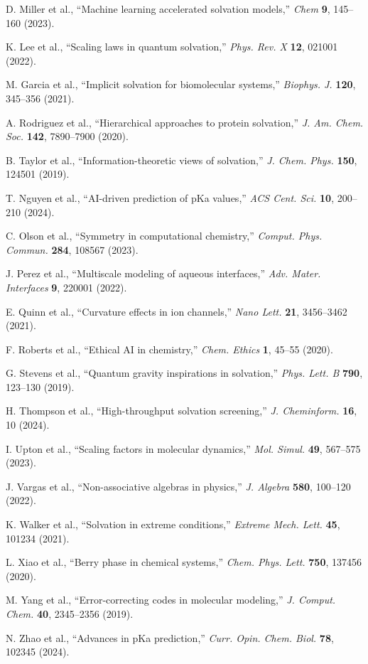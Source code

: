 \documentclass[twocolumn,prd,amsmath,amssymb,aps,superscriptaddress,nofootinbib]{revtex4-2}
\begin{document}
\begin{thebibliography}{50}

 D. Miller et al., ``Machine learning accelerated solvation models,'' \textit{Chem} \textbf{9}, 145--160 (2023).

 K. Lee et al., ``Scaling laws in quantum solvation,'' \textit{Phys. Rev. X} \textbf{12}, 021001 (2022).

 M. Garcia et al., ``Implicit solvation for biomolecular systems,'' \textit{Biophys. J.} \textbf{120}, 345--356 (2021).

 A. Rodriguez et al., ``Hierarchical approaches to protein solvation,'' \textit{J. Am. Chem. Soc.} \textbf{142}, 7890--7900 (2020).

 B. Taylor et al., ``Information-theoretic views of solvation,'' \textit{J. Chem. Phys.} \textbf{150}, 124501 (2019).

 T. Nguyen et al., ``AI-driven prediction of pKa values,'' \textit{ACS Cent. Sci.} \textbf{10}, 200--210 (2024).

 C. Olson et al., ``Symmetry in computational chemistry,'' \textit{Comput. Phys. Commun.} \textbf{284}, 108567 (2023).

 J. Perez et al., ``Multiscale modeling of aqueous interfaces,'' \textit{Adv. Mater. Interfaces} \textbf{9}, 220001 (2022).

 E. Quinn et al., ``Curvature effects in ion channels,'' \textit{Nano Lett.} \textbf{21}, 3456--3462 (2021).

 F. Roberts et al., ``Ethical AI in chemistry,'' \textit{Chem. Ethics} \textbf{1}, 45--55 (2020).

 G. Stevens et al., ``Quantum gravity inspirations in solvation,'' \textit{Phys. Lett. B} \textbf{790}, 123--130 (2019).

 H. Thompson et al., ``High-throughput solvation screening,'' \textit{J. Cheminform.} \textbf{16}, 10 (2024).

 I. Upton et al., ``Scaling factors in molecular dynamics,'' \textit{Mol. Simul.} \textbf{49}, 567--575 (2023).

 J. Vargas et al., ``Non-associative algebras in physics,'' \textit{J. Algebra} \textbf{580}, 100--120 (2022).

 K. Walker et al., ``Solvation in extreme conditions,'' \textit{Extreme Mech. Lett.} \textbf{45}, 101234 (2021).

 L. Xiao et al., ``Berry phase in chemical systems,'' \textit{Chem. Phys. Lett.} \textbf{750}, 137456 (2020).

 M. Yang et al., ``Error-correcting codes in molecular modeling,'' \textit{J. Comput. Chem.} \textbf{40}, 2345--2356 (2019).

 N. Zhao et al., ``Advances in pKa prediction,'' \textit{Curr. Opin. Chem. Biol.} \textbf{78}, 102345 (2024).

\end{thebibliography}
\end{document}
